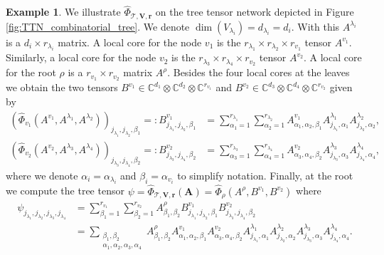 \documentclass[12pt]{article}
\theoremstyle{definition}
\newtheorem{example}[theorem]{Example}
\numberwithin{theorem}{section}
\newcommand{\CC}{\mathbb{C}}
\begin{document}
\begin{example} \label{ex:main_TTN}
 We illustrate $\widehat{\Phi}_{\mathscr{T}, \mathbf{V}, \mathbf{r}}$ on the tree tensor network depicted in Figure 
 \ref{fig:TTN_combinatorial_tree}.
 We denote $\dim(V_{\lambda_i})=d_{\lambda_i} = d_i$. With this $A^{\lambda_i}$ is a $d_i \times r_{\lambda_i}$ matrix. A local core for the node $v_1$ is the $r_{\lambda_1}\times r_{\lambda_2} \times r_{v_1}$ tensor
 $A^{v_1}$. Similarly, a local core for the node $v_2$ is the $r_{\lambda_3}\times r_{\lambda_4} \times r_{v_2}$ tensor
 $A^{v_2}$. 
 A local core for the root $\rho$ is a $r_{v_1} \times r_{v_2}$ matrix $A^{\rho}$. Besides the four local cores at the leaves
 we obtain the two tensors $B^{v_1} \in \CC^{d_1} \otimes \CC^{d_2} \otimes \CC^{r_{v_1}}$ and $B^{v_2} \in \CC^{d_3} \otimes \CC^{d_4} \otimes \CC^{r_{v_2}}$ given by
 \begin{align*}
     (\widehat{\Phi}_{v_1}(A^{v_1}, A^{\lambda_1}, A^{\lambda_2}))_{j_{\lambda_1},j_{\lambda_2},\beta_1}=:B^{v_1}_{j_{\lambda_1},j_{\lambda_2},\beta_1} &= \sum_{\alpha_1=1}^{r_{\lambda_1}}\sum_{\alpha_2=1}^{r_{\lambda_2}} A^{v_1}_{\alpha_1,\alpha_2, \beta_1} A^{\lambda_1}_{j_{\lambda_1},\alpha_1} A^{\lambda_2}_{j_{\lambda_2},\alpha_2}, \\
 (\widehat{\Phi}_{v_2}(A^{v_2}, A^{\lambda_3}, A^{\lambda_4}))_{j_{\lambda_3},j_{\lambda_4},\beta_2}=:B^{v_2}_{j_{\lambda_3},j_{\lambda_4},\beta_2} &= \sum_{\alpha_3=1}^{r_{\lambda_3}}\sum_{\alpha_4=1}^{r_{\lambda_4}} A^{v_2}_{\alpha_3,\alpha_4, \beta_2} A^{\lambda_3}_{j_{\lambda_3},\alpha_3} A^{\lambda_4}_{j_{\lambda_4},\alpha_4},
 \end{align*}
 where we denote $\alpha_i = \alpha_{\lambda_i}$ and $\beta_i = \alpha_{v_i}$ to simplify notation.
 Finally, at the root we compute the tree tensor $\psi = \widehat{\Phi}_{\mathscr{T}, \mathbf{V}, \mathbf{r}}(\mathbf{A}) = \widehat{\Phi}_\rho(A^\rho, B^{v_1}, B^{v_2})$ where
 \begin{align}\label{eq:example_TTN_N_4}
     \psi_{j_{\lambda_1},j_{\lambda_2},j_{\lambda_3},j_{\lambda_4}} &= \sum_{\beta_1 =1}^{r_{v_1}}\sum_{\beta_2 =1}^{r_{v_2}} A^\rho_{\beta_1,\beta_2}B^{v_1}_{j_{\lambda_1},j_{\lambda_2},\beta_1}B^{v_2}_{j_{\lambda_3},j_{\lambda_4},\beta_2} \nonumber\\
     &= \sum_{\substack{\beta_1, \beta_2 \\ \alpha_1, \alpha_2, \alpha_3, \alpha_4}} A^\rho_{\beta_1,\beta_2}A^{v_1}_{\alpha_1,\alpha_2, \beta_1}A^{v_2}_{\alpha_3,\alpha_4, \beta_2} A^{\lambda_1}_{j_{\lambda_1},\alpha_1} A^{\lambda_2}_{j_{\lambda_2},\alpha_2}A^{\lambda_3}_{j_{\lambda_3},\alpha_3} A^{\lambda_4}_{j_{\lambda_4},\alpha_4}.
 \end{align} 
\end{example}
\end{document}
